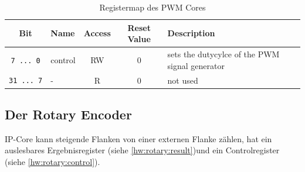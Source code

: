 \begin{table}
\begin{longtable}[]{@{}c|l|c|c|l@{}}
	\textbf{Bit} & \textbf{Name} & \textbf{Access} & \textbf{Reset Value} &
	\textbf{Description}\tabularnewline

	\endhead
	\texttt{7\ ...\ 0} & control & RW & 0 & sets the dutycylce of the PWM
	signal generator\tabularnewline
	\texttt{31\ ...\ 7} & - & R & 0 & not used\tabularnewline

\end{longtable}
\caption{Registermap des PWM Cores}
\label{hw:pwm}
\end{table}

\subsection{Der Rotary Encoder} \ac{IP}-Core kann steigende Flanken von einer externen Flanke zählen, hat ein auslesbares Ergebnisregister (siehe \ref{hw:rotary:result})und ein Controlregister (siehe \ref{hw:rotary:control}).

